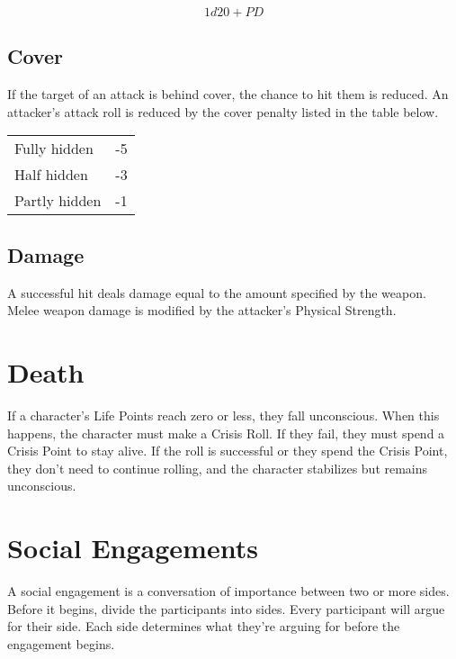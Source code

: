 \begin{multicols}{2}
$$1d20 + PD$$

\subsection{Cover}

If the target of an attack is behind cover, the chance to hit them is reduced.
An attacker's attack roll is reduced by the cover penalty listed in the table
below.

\begin{center}
{
\begin{xtabular}{|l|l|}
Fully hidden & -5 \\
Half hidden & -3 \\
Partly hidden & -1 \\
\hline
\end{xtabular}
}
\end{center}

\subsection{Damage}

A successful hit deals damage equal to the amount specified by
the weapon. Melee weapon damage is modified by the attacker's Physical Strength.

\section{Death}

If a character's Life Points reach zero or less, they fall unconscious. When this happens,
the character must make a Crisis Roll. If they fail, they must spend a Crisis Point to stay
alive. If the roll is successful or they spend the Crisis Point, they don't need to continue
rolling, and the character stabilizes but remains unconscious.

\section{Social Engagements}

A social engagement is a conversation of importance between two or more sides. Before it begins,
divide the participants into sides. Every participant will argue for their side. Each side
determines what they're arguing for before the engagement begins.


\end{multicols}

